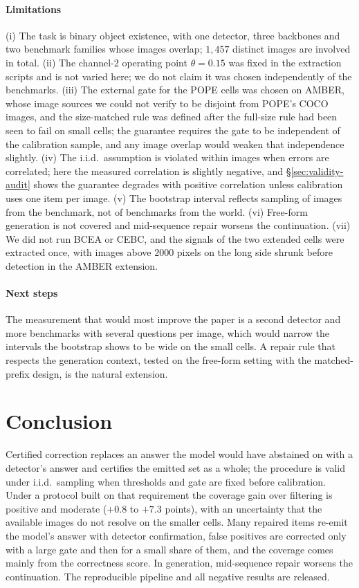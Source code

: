 \paragraph{Limitations}
(i) The task is binary object existence, with one detector, three backbones and two benchmark families whose
images overlap; $1{,}457$ distinct images are involved in total. (ii) The channel-2 operating point $\theta=0.15$ was fixed
in the extraction scripts and is not varied here; we do not claim it was chosen independently of the benchmarks.
(iii) The external gate for the POPE cells was chosen on AMBER, whose image sources we could not verify to be disjoint from
POPE's COCO images, and the size-matched rule was defined after the full-size rule had been seen to fail on small cells; the guarantee requires the gate to be independent of the calibration sample, and any image overlap
would weaken that independence slightly. (iv) The i.i.d.\ assumption is violated within images when errors are correlated; here the
measured correlation is slightly negative, and \S\ref{sec:validity-audit} shows the guarantee degrades with positive
correlation unless calibration uses one item per image. (v) The bootstrap interval reflects sampling of images from the benchmark, not
of benchmarks from the world. (vi) Free-form generation is not covered and mid-sequence repair worsens the continuation.
(vii) We did not run BCEA or CEBC, and the signals of the two extended cells were extracted once, with images above $2000$ pixels on the long side shrunk before detection in the AMBER extension.

\paragraph{Next steps}
The measurement that would most improve the paper is a second detector and more benchmarks with several questions per image, which would narrow the
intervals the bootstrap shows to be wide on the small cells. A repair rule that
respects the generation context, tested on the free-form setting with the matched-prefix design, is the natural
extension.

\section{Conclusion}
\label{sec:conclusion}

Certified correction replaces an answer the model would have abstained on with a detector's answer and
certifies the emitted set as a whole; the procedure is valid under i.i.d.\ sampling when thresholds and gate are
fixed before calibration. Under a protocol built on that requirement the coverage gain over filtering is positive and moderate ($+0.8$ to $+7.3$ points), with
an uncertainty that the available images do not resolve on the smaller cells. Many repaired items re-emit the model's answer with detector
confirmation, false positives are corrected only with a large gate and then for a small share of them, and the coverage comes mainly from
the correctness score.
In generation, mid-sequence repair worsens the continuation. The reproducible pipeline and all negative results are released.
